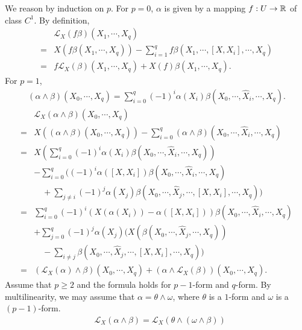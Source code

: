 \begin{proofenv}
    We reason by induction on $p$.
    For $p=0$, $\alpha$ is given by a mapping $f : U \rightarrow \RR$ of class $C^1$.
    By definition,
    $$\begin{aligned}
        & \mathcal{L}_{X}(f \beta)(X_1,\cdots,X_q)\\
        = & X(f\beta(X_1,\cdots,X_q)) - \sum_{i=1}^{q}f \beta(X_1,\cdots,[X,X_i],\cdots,X_q)\\
        = & f \mathcal{L}_{X}(\beta)(X_1,\cdots,X_q) + X(f) \beta(X_1,\cdots,X_q).
    \end{aligned}$$
    For $p = 1$,
    $$\begin{aligned}
        (\alpha \wedge \beta)(X_0,\cdots,X_q) = \sum_{i=0}^{q} (-1)^i \alpha(X_i) \beta(X_0,\cdots,\hat{X}_i,\cdots,X_q).
    \end{aligned}$$
    $$\begin{aligned}
        & \mathcal{L}_{X}(\alpha \wedge \beta) (X_0,\cdots,X_q)\\
        = & X \left((\alpha \wedge \beta)(X_0,\cdots,X_q)\right) - \sum_{i=0}^{q}(\alpha \wedge \beta)(X_0,\cdots,\hat{X}_i,\cdots,X_q)\\
        = & X\left(\sum_{i=0}^{q}(-1)^i \alpha (X_i) \beta(X_0,\cdots,\hat{X}_i,\cdots,X_q)\right)\\
        & - \sum_{i=0}^{q}((-1)^{i}\alpha([X,X_i]) \beta(X_0,\cdots,\hat{X}_i,\cdots,X_q)\\
        & \quad + \sum_{j \neq i} (-1)^j \alpha(X_j) \beta(X_0,\cdots,\hat{X}_j,\cdots,[X,X_i],\cdots,X_q))\\
        = & \sum_{i=0}^{q}(-1)^{i} \left(X(\alpha(X_i)) - \alpha([X,X_i])\right) \beta(X_0,\cdots,\hat{X}_i,\cdots,X_q)\\
        & + \sum_{j=0}^{q}(-1)^{j} \alpha(X_j) (X(\beta(X_0,\cdots,\hat{X}_j,\cdots,X_q))\\
        & \quad - \sum_{i \neq j} \beta(X_0,\cdots,\hat{X}_j,\cdots,[X,X_i],\cdots,X_q))\\
        = & (\mathcal{L}_{X}(\alpha) \wedge \beta)(X_0,\cdots,X_q) + (\alpha \wedge \mathcal{L}_{X}(\beta))(X_0,\cdots,X_q).
    \end{aligned}$$
    Assume that $p \ge 2$ and the formula holds for $p-1$-form and $q$-form.
    By multilinearity, we may assume that $\alpha = \theta \wedge \omega$, where $\theta$ is a $1$-form and $\omega$ is a $(p-1)$-form.
    $$\begin{aligned}
        & \mathcal{L}_{X}(\alpha \wedge \beta) = \mathcal{L}_{X}\left(\theta \wedge (\omega \wedge \beta)\right)\\

\end{aligned}$$
\end{proofenv}
